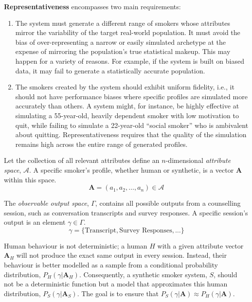 \textbf{Representativeness} encompasses two main requirements:

\begin{enumerate}
	\item The system must generate a different range of smokers whose attributes mirror the variability of the target real-world population. It must avoid the bias of over-representing a narrow or easily simulated archetype at the expense of mirroring the population's true statistical makeup. This may happen for a variety of reasons. For example, if the system is built on biased data, it may fail to generate a statistically accurate population.

	\item The smokers created by the system should exhibit uniform fidelity, i.e., it should not have performance biases where specific profiles are simulated more accurately than others. A system might, for instance, be highly effective at simulating a 55-year-old, heavily dependent smoker with low motivation to quit, while failing to simulate a 22-year-old ``social smoker'' who is ambivalent about quitting. Representativeness requires that the quality of the simulation remains high across the entire range of generated profiles.
\end{enumerate}



Let the collection of all relevant attributes define an $n$-dimensional \emph{attribute space}, $\mathcal{A}$. A specific smoker's profile, whether human or synthetic, is a vector $\textbf{A}$ within this space.
\[\textbf{A} = (a_1, a_2, \ldots, a_n) \in \mathcal{A}\]

The \emph{observable output space}, $\Gamma$, contains all possible outputs from a counselling session, such as conversation transcripts and survey responses. A specific session's output is an element $\gamma \in \Gamma$.
\[\gamma = \{\text{Transcript}, \text{Survey Responses}, \ldots\}\]

Human behaviour is not deterministic; a human $H$ with a given attribute vector $\textbf{A}_H$ will not produce the exact same output in every session. Instead, their behaviour is better modelled as a sample from a conditional probability distribution, $P_H(\gamma | \textbf{A}_H)$. Consequently, a synthetic smoker system, $S$, should not be a deterministic function but a model that approximates this human distribution, $P_S(\gamma | \textbf{A}_S)$. The goal is to ensure that $P_S(\gamma | \textbf{A}) \approx P_H(\gamma | \textbf{A})$.

